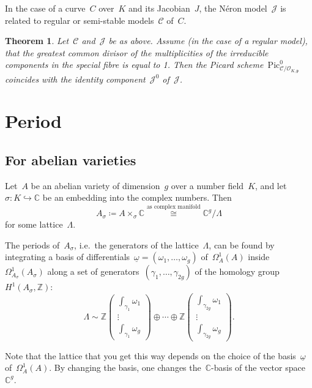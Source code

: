 \documentclass[12pt]{article}
\newtheorem{theorem}{Theorem}[section]
\theoremstyle{definition}
\numberwithin{equation}{subsection}
\newcommand{\C}{\ensuremath{\mathbb{C}}}
\newcommand{\Z}{\ensuremath{\mathbb{Z}}}
\begin{document}
In the case of a curve~$C$ over~$K$ and its Jacobian~$J$, the N\'eron model~$\mathcal{J}$ is related to regular or semi-stable models~$\mathcal{C}$ of~$C$.

\begin{theorem}
Let~$\mathcal{C}$ and~$\mathcal{J}$ be as above. Assume (in the case of a regular model), that the greatest common divisor of the multiplicities of the irreducible components in the special fibre is equal to 1. Then the Picard scheme~$\mathrm{Pic}^0_{\mathcal{C}/\mathcal{O}_{K,\mathfrak{p}}}$ coincides with the identity component~$\mathcal{J}^0$ of~$\mathcal{J}$.
\end{theorem}

\section{Period}

\subsection{For abelian varieties}

Let~$A$ be an abelian variety of dimension~$g$ over a number field~$K$, and let~$\sigma \colon K \hookrightarrow \C$ be an embedding into the complex numbers. Then
$$A_\sigma \coloneqq A \times_\sigma \C \stackrel{\textrm{as complex manifold}}{\cong} \C^g / \Lambda$$
for some lattice~$\Lambda$.

The periods of~$A_\sigma$, i.e.\ the generators of the lattice~$\Lambda$, can be found by integrating a basis of differentials~$\underline{\omega} = (\omega_1, \ldots, \omega_g)$ of~$\Omega^1_A(A)$ inside~$\Omega^1_{A_\sigma}(A_\sigma)$ along a set of generators~$(\gamma_1, \ldots, \gamma_{2g})$ of the homology group~$H^1(A_{\sigma}, \Z)$:
\begin{equation}\label{eq:lambda}\Lambda \sim \Z \begin{pmatrix} \int_{\gamma_1} \omega_1 \\ \vdots \\\int_{\gamma_1} \omega_g\end{pmatrix} \oplus \cdots \oplus \Z \begin{pmatrix} \int_{\gamma_{2g}} \omega_1 \\ \vdots \\\int_{\gamma_{2g}} \omega_g\end{pmatrix}.\end{equation}

Note that the lattice that you get this way depends on the choice of the basis~$\underline{\omega}$ of~$\Omega^1_{A}(A)$.
By changing the basis, one changes the~$\C$-basis of the vector space~$\C^g$.
\end{document}
